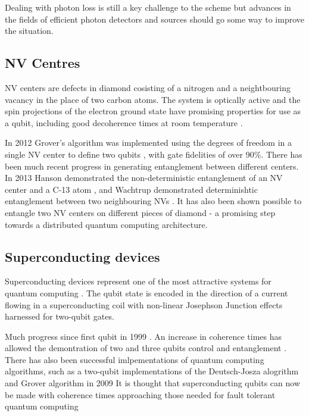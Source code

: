 Dealing with photon loss is still a key challenge to the scheme but advances in the fields of efficient photon detectors \cite{single_photon_detector_review_09} and sources \cite{single_photon_source_review_04} should go some way to improve the situation.

\subsection{NV Centres}

NV centers are defects in diamond cosisting of a nitrogen and a neightbouring vacancy in the place of two carbon atoms. The system is optically active and the spin projections of the electron ground state have promising properties for use as a qubit, including good decoherence times at room temperature \cite{nv_review, nv_oscillation_04}. 

In 2012 Grover's algorithm was implemented using the degrees of freedom in a single NV center to define two qubits \cite{two_qubit_nv}, with gate fidelities of over 90\%. There has been much recent progress in generating entanglement between different centers. In 2013 Hanson demonstrated the non-deterministic entanglement of an NV center and a C-13 atom \cite{nv_entanglement_hanson}, and Wachtrup demonstrated determinishtic entanglement between two neighbouring NVs \cite{nv_entanglement_wachtrup}. It has also been shown possible to entangle two NV centers on different pieces of diamond \cite{remote_nv_entanglement_hanson} - a promising step towards a distributed quantum computing architecture.  

\subsection{Superconducting devices}

Superconducting devices represent one of the most attractive systems for quantum computing  \cite{superconducting_review_11}. The qubit state is encoded in the direction of a current flowing in a superconducting coil with  non-linear Josephson Junction \cite{josephson_junction} effects harnessed for two-qubit gates.

Much progress since first qubit in 1999 \cite{superconducting_first_qubit}. An increase in coherence times \cite{superconducting_better_coherence_03} has allowed the demontration of two and three qubits control and entanglement \cite{ superconduction_bell_violation_09, superconducting_measurement_10}. There has also been successful imlpementations of quantum computing algorithms, such as a two-qubit implementations of the Deutsch-Josza alogrithm and Grover algorithm in 2009 \cite{two_qubit_chip_yale}
It is thought that superconducting qubits can now be made with coherence times approaching those needed for fault tolerant quantum computing \cite{superconducting_long_coherence_11}

